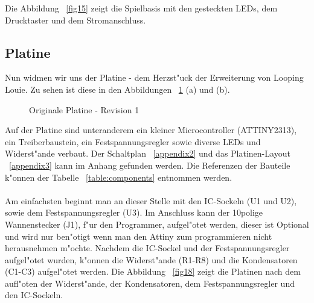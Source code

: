 Die Abbildung ~\ref{fig15} zeigt die Spielbasis mit den gesteckten LEDs, dem Drucktaster und dem Stromanschluss. 


\newpage
\subsection{Platine}

Nun widmen wir uns der Platine - dem Herzst"uck der Erweiterung von Looping Louie. Zu sehen ist diese in den Abbildungen ~\ref{fig16} (a) und (b).

\vspace{1cm}
\begin{figure}[!ht]
	\centering
	\caption{Originale Platine - Revision 1}
	\label{fig16}
\end{figure}
\vspace{0.5cm}

Auf der Platine sind unteranderem ein kleiner Microcontroller (ATTINY2313), ein Treiberbaustein, ein Festspannungsregler sowie diverse LEDs und Widerst"ande verbaut. Der Schaltplan ~\ref{appendix2} und das Platinen-Layout ~\ref{appendix3} kann im Anhang gefunden werden. Die Referenzen der Bauteile k"onnen der Tabelle ~\ref{table:components} entnommen werden.  \\
\\
Am einfachsten beginnt man an dieser Stelle mit den IC-Sockeln (U1 und U2), sowie dem Festspannungsregler (U3). Im Anschluss kann der 10polige Wannenstecker (J1), f"ur den Programmer, aufgel"otet werden, dieser ist Optional und wird nur ben"otigt wenn man den Attiny zum programmieren nicht herausnehmen m"ochte.
Nachdem die IC-Sockel und der Festspannungsregler aufgel"otet wurden, k"onnen die Widerst"ande (R1-R8) und die Kondensatoren (C1-C3) aufgel"otet werden.
Die Abbildung ~\ref{fig18} zeigt die Platinen nach dem aufl"oten der Widerst"ande, der Kondensatoren, dem Festspannungsregler und den IC-Sockeln.

